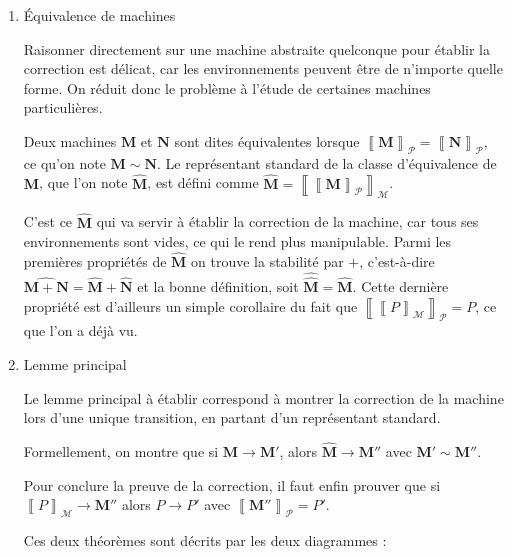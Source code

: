 \documentclass[11pt]{article}
\newcommand{\machine}[1]{\left\llbracket{#1}\right\rrbracket_{\mathcal{M}}}
\newcommand{\process}[1]{\left\llbracket{#1}\right\rrbracket_{\mathcal{P}}}
\begin{document}
\begin{enumerate}
\item \'Equivalence de machines
\label{sec-3-2-3-2}

Raisonner directement sur une machine abstraite quelconque pour établir la correction est délicat, car les environnements peuvent être de n'importe quelle forme.
On réduit donc le problème à l'étude de certaines machines particulières.

Deux machines $\mathbf{M}$ et $\mathbf{N}$ sont dites équivalentes lorsque $\process{\mathbf{M}} = \process{\mathbf{N}}$, ce qu'on note $\mathbf{M}\sim \mathbf{N}$.
Le représentant standard de la classe d'équivalence de $\mathbf{M}$, que l'on note $\widehat{\mathbf{M}}$, est défini comme $\widehat{\mathbf{M}} = \machine{\process{\mathbf{M}}}$.

C'est ce $\widehat{\mathbf{M}}$ qui va servir à établir la correction de la machine, car tous ses environnements sont vides, ce qui le rend plus manipulable.
Parmi les premières propriétés de $\widehat{\mathbf{M}}$ on trouve la stabilité par $+$, c'est-à-dire $\widehat{\mathbf{M+N}} = \widehat{\mathbf{M}} + \widehat{\mathbf{N}}$ et la bonne définition, soit $\widehat{\widehat{\mathbf{M}}} = \widehat{\mathbf{M}}$.
Cette dernière propriété est d'ailleurs un simple corollaire du fait que $\process{\machine{P}} = P$, ce que l'on a déjà vu.

\item Lemme principal
\label{sec-3-2-3-3}

Le lemme principal à établir correspond à montrer la correction de la machine lors d'une unique transition, en partant d'un représentant standard.

Formellement, on montre que si $\mathbf{M}\to \mathbf{M}'$, alors $\widehat{\mathbf{M}}\to \mathbf{M}''$ avec $\mathbf{M}'\sim \mathbf{M}''$.

Pour conclure la preuve de la correction, il faut enfin prouver que si $\machine{P}\to \mathbf{M}''$ alors $P\to P'$ avec $\process{\mathbf{M}''} = P'$.

Ces deux théorèmes sont décrits par les deux diagrammes :\\

\end{enumerate}
\end{document}
